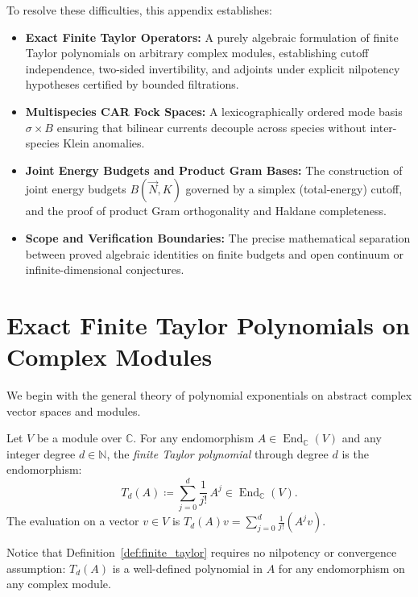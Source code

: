 To resolve these difficulties, this appendix establishes:
\begin{itemize}
    \item \textbf{Exact Finite Taylor Operators:} A purely algebraic formulation of finite Taylor polynomials on arbitrary complex modules, establishing cutoff independence, two-sided invertibility, and adjoints under explicit nilpotency hypotheses certified by bounded filtrations.
    \item \textbf{Multispecies CAR Fock Spaces:} A lexicographically ordered mode basis $\sigma \times B$ ensuring that bilinear currents decouple across species without inter-species Klein anomalies.
    \item \textbf{Joint Energy Budgets and Product Gram Bases:} The construction of joint energy budgets $B(\vec{N}, K)$ governed by a simplex (total-energy) cutoff, and the proof of product Gram orthogonality and Haldane completeness.
    \item \textbf{Scope and Verification Boundaries:} The precise mathematical separation between proved algebraic identities on finite budgets and open continuum or infinite-dimensional conjectures.
\end{itemize}

\section{Exact Finite Taylor Polynomials on Complex Modules}

We begin with the general theory of polynomial exponentials on abstract
complex vector spaces and modules.

\begin{definition}
\label{def:finite_taylor}
Let $V$ be a module over $\mathbb{C}$. For any endomorphism $A \in \operatorname{End}_{\mathbb{C}}(V)$ and any integer degree $d \in \mathbb{N}$, the \emph{finite Taylor polynomial} through degree $d$ is the endomorphism:
\begin{equation}
\label{eq:finite_taylor_def}
T_d(A) \coloneqq \sum_{j=0}^d \frac{1}{j!}\, A^j \in \operatorname{End}_{\mathbb{C}}(V).
\end{equation}
The evaluation on a vector $v \in V$ is $T_d(A) v = \sum_{j=0}^d \frac{1}{j!} (A^j v)$.
\end{definition}

Notice that Definition~\ref{def:finite_taylor} requires no nilpotency or convergence assumption: $T_d(A)$ is a well-defined polynomial in $A$ for any endomorphism on any complex module.

